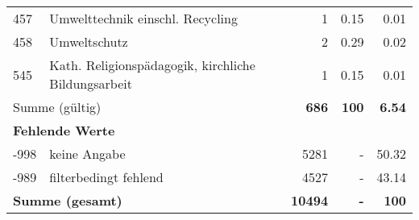 \begin{longtable}{lXrrr}
        457 & \multicolumn{1}{X}{Umwelttechnik einschl. Recycling} & %
          \num{1} &
          \num[round-mode=places,round-precision=2]{0,15} &
          \num[round-mode=places,round-precision=2]{0,01} \\

        458 & \multicolumn{1}{X}{Umweltschutz} & %
          \num{2} &
          \num[round-mode=places,round-precision=2]{0,29} &
          \num[round-mode=places,round-precision=2]{0,02} \\

        545 & \multicolumn{1}{X}{Kath. Religionspädagogik, kirchliche Bildungsarbeit} & %
          \num{1} &
          \num[round-mode=places,round-precision=2]{0,15} &
          \num[round-mode=places,round-precision=2]{0,01} \\

     \midrule
     \multicolumn{2}{l}{Summe (gültig)} &
       \textbf{\num{686}} &
     \textbf{100} &
       \textbf{\num[round-mode=places,round-precision=2]{6,54}} \\
     \multicolumn{5}{l}{\textbf{Fehlende Werte}}\\
       -998 &
       keine Angabe &
         \num{5281} &
        - &
         \num[round-mode=places,round-precision=2]{50,32} \\
       -989 &
       filterbedingt fehlend &
         \num{4527} &
        - &
         \num[round-mode=places,round-precision=2]{43,14} \\
     \midrule
     \multicolumn{2}{l}{\textbf{Summe (gesamt)}} &
          \textbf{\num{10494}} &
        \textbf{-} &
        \textbf{100} \\
     \bottomrule
     \end{longtable}
     
